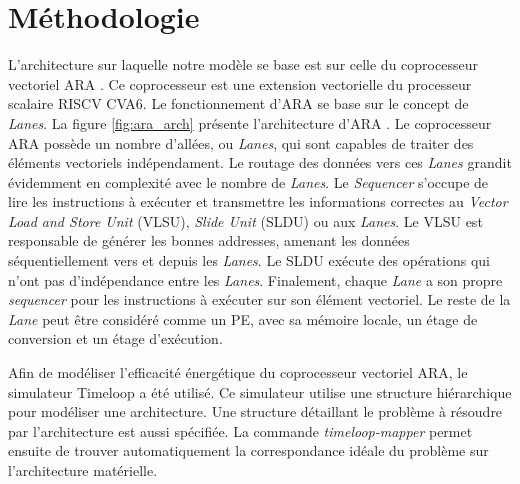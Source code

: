 \documentclass[10pt,letterpaper]{article}
\begin{document}
\section{Méthodologie}
    \begin{multicols}{2}

    L'architecture sur laquelle notre modèle se base est sur celle du coprocesseur 
    vectoriel ARA \cite{ara_paper}. Ce coprocesseur est une extension vectorielle du processeur scalaire
    RISCV CVA6. Le fonctionnement d’ARA se base sur le concept de \textit{Lanes}. 
    La figure \ref{fig:ara_arch} présente l'architecture d’ARA \cite{bougenot_2020}.
    Le coprocesseur ARA possède un nombre d'allées, ou \textit{Lanes}, qui sont capables de traiter des
    éléments vectoriels indépendament. Le routage des données vers ces \textit{Lanes} grandit évidemment en complexité
    avec le nombre de \textit{Lanes}. Le \textit{Sequencer} s'occupe de lire les instructions à exécuter 
    et transmettre les informations correctes au \textit{Vector Load and Store Unit} (VLSU), 
    \textit{Slide Unit} (SLDU) ou aux \textit{Lanes}. Le VLSU est responsable de générer les bonnes
    addresses, amenant les données séquentiellement vers et depuis les \textit{Lanes}. 
    Le SLDU exécute des opérations qui n'ont pas d'indépendance entre les \textit{Lanes}.
    Finalement, chaque \textit{Lane} a son propre \textit{sequencer} pour les instructions à exécuter
    sur son élément vectoriel. Le reste de la \textit{Lane} peut être considéré comme un PE, avec sa mémoire locale,
    un étage de conversion et un étage d'exécution.

    Afin de modéliser l'efficacité énergétique du coprocesseur vectoriel ARA, le simulateur Timeloop a été 
    utilisé. Ce simulateur utilise une structure hiérarchique pour modéliser une architecture. Une structure
    détaillant le problème à résoudre par l'architecture est aussi spécifiée. La commande \textit{timeloop-mapper}
    permet ensuite de trouver automatiquement la correspondance idéale du problème sur l'architecture matérielle.


\end{multicols}
\end{document}
